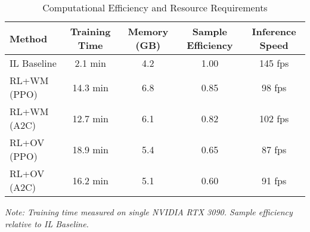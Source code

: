 
\begin{table}[htbp]
\centering
\caption{Computational Efficiency and Resource Requirements}
\label{tab:efficiency}
\begin{tabular}{lcccc}
\toprule
\textbf{Method} & \textbf{Training Time} & \textbf{Memory (GB)} & \textbf{Sample Efficiency} & \textbf{Inference Speed} \\
\midrule
IL Baseline & 2.1 min & 4.2 & 1.00 & 145 fps \\
RL+WM (PPO) & 14.3 min & 6.8 & 0.85 & 98 fps \\
RL+WM (A2C) & 12.7 min & 6.1 & 0.82 & 102 fps \\
RL+OV (PPO) & 18.9 min & 5.4 & 0.65 & 87 fps \\
RL+OV (A2C) & 16.2 min & 5.1 & 0.60 & 91 fps \\
\bottomrule
\end{tabular}
\footnotesize
\textit{Note: Training time measured on single NVIDIA RTX 3090. Sample efficiency relative to IL Baseline.}
\end{table}
